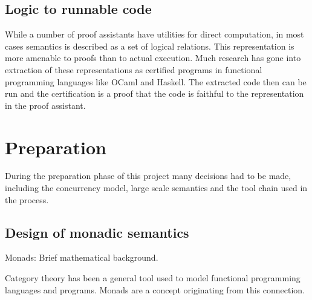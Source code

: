 \documentclass[12pt,twoside,notitlepage]{report}
\begin{document}
\section{Logic to runnable code}
While a number of proof assistants have utilities for direct computation, in most cases semantics is described as a set of logical relations. This representation is more amenable to proofs than to actual execution. Much research has gone into extraction of these representations as certified programs in functional programming languages like OCaml \cite{letouzey2008extraction} and Haskell. The extracted code then can be run and the certification is a proof that the code is faithful to the representation in the proof assistant.



\chapter{Preparation}
During the preparation phase of this project many decisions had to be made, including the concurrency model, large scale semantics and the tool chain used in the process.

\section{Design of monadic semantics}
Monads: Brief mathematical background.

Category theory has been a general tool used to model functional programming languages and programs. Monads are a concept originating from this connection. 
\end{document}
